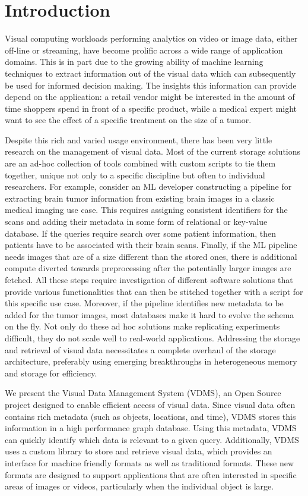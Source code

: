 \section{Introduction}
\label{intro}

Visual computing workloads performing analytics on
video or image data, either off-line or streaming,
have become prolific across a wide range of application domains.
This is in part due to the growing ability of machine learning techniques to
extract information out of the visual data which can subsequently be used
for informed decision making.
The insights this information can provide depend on the
application: a retail vendor might be interested in the amount of time
shoppers spend in front of a specific product, while a medical expert might
want to see the effect of a specific treatment on the size of a tumor.

Despite this rich and varied usage environment, there has been very little
research on the management of visual data.
Most of the current storage solutions are
an ad-hoc collection of tools combined with custom scripts to tie them
together, unique not only to a specific discipline but often to individual
researchers. For example, consider an ML developer constructing a pipeline
for extracting brain tumor information from existing brain images in a
classic medical imaging use case. This requires assigning consistent
identifiers for the scans and adding their metadata in
some form of relational or key-value database. If the queries require
search over some patient information, then patients have to be associated
with their brain scans. Finally, if the ML pipeline needs images that
are of a size different than the stored ones, there is additional compute
diverted towards preprocessing after the potentially larger images are
fetched. All these steps require investigation of different software
solutions that provide various functionalities that can then be stitched
together with a script for this specific use case.
Moreover, if the pipeline identifies
new metadata to be added for the tumor images, most databases make it
hard to evolve the schema on the fly.
Not only do these ad hoc solutions make replicating experiments
difficult, they do not scale well to real-world applications.
Addressing the storage and retrieval of visual data necessitates a complete
overhaul of the storage architecture,
preferably using emerging breakthroughs in
heterogeneous memory and storage for efficiency.

We present the Visual Data Management System (VDMS)\cite{darkside},
an Open Source project designed to enable efficient access of visual data.
Since visual data often contains
rich metadata (such as objects, locations, and time), VDMS stores this
information in a high performance graph database. Using this metadata, VDMS
can quickly identify which data is relevant to a given query.
Additionally, VDMS uses a custom library to store and retrieve visual data,
which provides an interface for machine friendly formats as well as
traditional formats. These new formats are designed to support applications
that are often interested in specific areas of images or videos,
particularly when the individual object is large.


